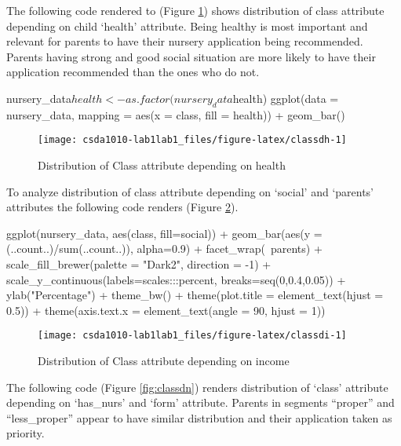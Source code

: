 The following code rendered to (Figure \ref{fig:classdh}) shows
distribution of class attribute depending on child `health' attribute.
Being healthy is most important and relevant for parents to have their
nursery application being recommended. Parents having strong and good
social situation are more likely to have their application recommended
than the ones who do not.

\begin{Schunk}
\begin{Sinput}
nursery_data$health <- as.factor(nursery_data$health)
ggplot(data = nursery_data, mapping = aes(x = class, fill = health)) +
  geom_bar()
\end{Sinput}
\begin{figure}[h]

{\centering \texttt{[image: csda1010-lab1lab1\_files/figure-latex/classdh-1]} 

}

\caption[Distribution of Class attribute depending on health]{Distribution of Class attribute depending on health}\label{fig:classdh}
\end{figure}
\end{Schunk}

To analyze distribution of class attribute depending on `social' and
`parents' attributes the following code renders (Figure
\ref{fig:classdi}).

\begin{Schunk}
\begin{Sinput}
ggplot(nursery_data, aes(class, fill=social)) + 
  geom_bar(aes(y = (..count..)/sum(..count..)), alpha=0.9) +
  facet_wrap(~parents) + 
  scale_fill_brewer(palette = "Dark2", direction = -1) +
  scale_y_continuous(labels=scales:::percent, breaks=seq(0,0.4,0.05)) +
  ylab("Percentage") +
  theme_bw() +
  theme(plot.title = element_text(hjust = 0.5)) +
  theme(axis.text.x = element_text(angle = 90, hjust = 1))
\end{Sinput}
\begin{figure}[h]

{\centering \texttt{[image: csda1010-lab1lab1\_files/figure-latex/classdi-1]} 

}

\caption[Distribution of Class attribute depending on income]{Distribution of Class attribute depending on income}\label{fig:classdi}
\end{figure}
\end{Schunk}

The following code (Figure \ref{fig:classdn}) renders distribution of
`class' attribute depending on `has\_nurs' and `form' attribute. Parents
in segments ``proper'' and ``less\_proper'' appear to have similar
distribution and their application taken as priority.


